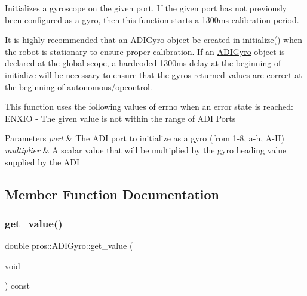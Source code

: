 Initializes a gyroscope on the given port. If the given port has not previously been configured as a gyro, then this function starts a 1300ms calibration period.

It is highly recommended that an \hyperlink{classpros_1_1ADIGyro}{A\+D\+I\+Gyro} object be created in \hyperlink{main_8h_a9efe22aaead3a5e936b5df459de02eba}{initialize()} when the robot is stationary to ensure proper calibration. If an \hyperlink{classpros_1_1ADIGyro}{A\+D\+I\+Gyro} object is declared at the global scope, a hardcoded 1300ms delay at the beginning of initialize will be necessary to ensure that the gyro\textquotesingle{}s returned values are correct at the beginning of autonomous/opcontrol.

This function uses the following values of errno when an error state is reached\+: E\+N\+X\+IO -\/ The given value is not within the range of A\+DI Ports


\begin{DoxyParams}{Parameters}
{\em port} & The A\+DI port to initialize as a gyro (from 1-\/8, \textquotesingle{}a\textquotesingle{}-\/\textquotesingle{}h\textquotesingle{}, \textquotesingle{}A\textquotesingle{}-\/\textquotesingle{}H\textquotesingle{}) \\
\hline
{\em multiplier} & A scalar value that will be multiplied by the gyro heading value supplied by the A\+DI \\
\hline
\end{DoxyParams}


\subsection{Member Function Documentation}
\mbox{\label{classpros_1_1ADIGyro_a829f933aaaa370483c36aba9f4a4f09c}} 
\subsubsection{\texorpdfstring{get\+\_\+value()}{get\_value()}}
{\footnotesize\ttfamily double pros\+::\+A\+D\+I\+Gyro\+::get\+\_\+value (\begin{DoxyParamCaption}\item[{void}]{ }\end{DoxyParamCaption}) const}


